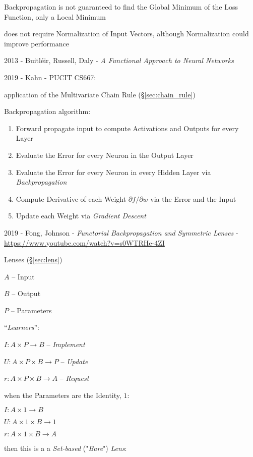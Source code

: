 Backpropagation is not guaranteed to find the Global Minimum of the Loss
Function, only a Local Minimum

does not require Normalization of Input Vectors, although Normalization could
improve performance

2013 - Buitl\'eir, Russell, Daly -
\emph{A Functional Approach to Neural Networks}

2019 - Kahn - PUCIT CS667:

application of the Multivariate Chain Rule (\S\ref{sec:chain_rule})

Backpropagation algorithm:
\begin{enumerate}
  \item Forward propagate input to compute Activations and Outputs for every
    Layer
  \item Evaluate the Error for every Neuron in the Output Layer
  \item Evaluate the Error for every Neuron in every Hidden Layer via
    \emph{Backpropagation}
  \item Compute Derivative of each Weight $\partial f / \partial w$ via the
    Error and the Input
  \item Update each Weight via \emph{Gradient Descent}
\end{enumerate}

\asterism

2019 - Fong, Johnson - \emph{Functorial Backpropagation and Symmetric Lenses} -
\url{https://www.youtube.com/watch?v=s0WTRHe-4ZI}

\fist Lenses (\S\ref{sec:lens})

$A$ -- Input

$B$ -- Output

$P$ -- Parameters

``\emph{Learners}'':

$I : A \times P \rightarrow B$ -- \emph{Implement}

$U : A \times P \times B \rightarrow P$ -- \emph{Update}

$r : A \times P \times B \rightarrow A$ -- \emph{Request}

when the Parameters are the Identity, $1$:

$I : A \times 1 \rightarrow B$

$U : A \times 1 \times B \rightarrow 1$

$r : A \times 1 \times B \rightarrow A$

then this is a a \emph{Set-based} ("\emph{Bare}") \emph{Lens}:

